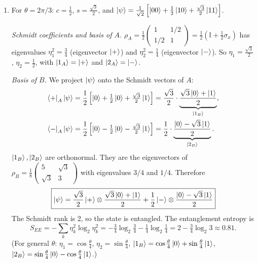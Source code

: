 \documentclass[11pt,a4paper]{article}
\newcommand{\id}{\mathbb{I}}
\begin{document}
\begin{enumerate}
\item For $\theta=2\pi/3$: $c=\frac12$, $s=\frac{\sqrt3}2$, and
$\ket\psi=\frac1{\sqrt2}\left[\ket{00}+\frac12\ket{10}+\frac{\sqrt3}2\ket{11}\right]$.

\emph{Schmidt coefficients and basis of $A$.} $\rho_A=\frac12\begin{pmatrix}1&1/2\\1/2&1\end{pmatrix}=\frac12\left(\id+\frac12\sigma_x\right)$
has eigenvalues $\eta_1^2=\frac34$ (eigenvector $\ket+$) and $\eta_2^2=\frac14$ (eigenvector $\ket-$).
So $\eta_1=\frac{\sqrt3}2$, $\eta_2=\frac12$, with $\ket{1_A}=\ket+$ and $\ket{2_A}=\ket-$.

\emph{Basis of $B$.} We project $\ket\psi$ onto the Schmidt vectors of $A$:
\begin{align*}
\bra{+}_A\ket\psi&=\frac12\left[\ket0+\tfrac12\ket0+\tfrac{\sqrt3}2\ket1\right]=\frac{\sqrt3}2\cdot\underbrace{\frac{\sqrt3\ket0+\ket1}{2}}_{\ket{1_B}},\\
\bra{-}_A\ket\psi&=\frac12\left[\ket0-\tfrac12\ket0-\tfrac{\sqrt3}2\ket1\right]=\frac12\cdot\underbrace{\frac{\ket0-\sqrt3\ket1}{2}}_{\ket{2_B}}.
\end{align*}
$\ket{1_B},\ket{2_B}$ are orthonormal. They are the eigenvectors of
$\rho_B=\frac18\begin{pmatrix}5&\sqrt3\\\sqrt3&3\end{pmatrix}$ with eigenvalues $3/4$ and $1/4$. Therefore
\[
\boxed{\ket\psi=\frac{\sqrt3}{2}\ket{+}\otimes\frac{\sqrt3\ket0+\ket1}{2}+\frac12\ket{-}\otimes\frac{\ket0-\sqrt3\ket1}{2}}
\]
The Schmidt rank is 2, so the state is entangled. The entanglement entropy is
\[
S_{EE}=-\sum_k\eta_k^2\log_2\eta_k^2=-\tfrac34\log_2\tfrac34-\tfrac14\log_2\tfrac14=2-\tfrac34\log_2 3\approx0.81 .
\]
(For general $\theta$: $\eta_1=\cos\frac\theta4$, $\eta_2=\sin\frac\theta4$, $\ket{1_B}=\cos\frac\theta4\ket0+\sin\frac\theta4\ket1$, $\ket{2_B}=\sin\frac\theta4\ket0-\cos\frac\theta4\ket1$.)


\end{enumerate}
\end{document}
